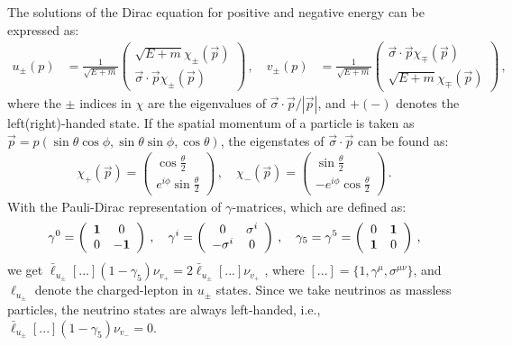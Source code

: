 \documentclass[prd,preprint,superscriptaddress,amsmath,amssymb]{revtex4}
\begin{document}
The solutions of the Dirac equation for positive and negative energy can be expressed as:
 \begin{align}
 u_{\pm} (p) &= \frac{1}{\sqrt{E+m} }
\left(
\begin{array}{c}
 \sqrt{E+m} \chi_{\pm} ( \vec{p})    \\
    \vec{\sigma}\cdot \vec{p} \chi_{\pm}(\vec{p})  
\end{array}
\right)\,, \quad  %
%
v_{\pm} (p) &= \frac{1}{\sqrt{E+m} }
\left(
\begin{array}{c}
  \vec{\sigma}\cdot \vec{p} \chi_{\mp}(\vec{p})    \\
     \sqrt{E+m} \chi_{\mp} ( \vec{p}) 
\end{array}
\right)\,, \label{eq:u_v}
 \end{align}
 where the $\pm$ indices in $\chi$ are the eigenvalues of $\vec{\sigma}\cdot \vec{p} /|\vec{p}|$, and  $+(-)$ denotes the left(right)-handed state. If the spatial momentum of a particle is taken as $\vec{p}= p(\sin\theta \cos\phi, \sin\theta\sin\phi, \cos\theta)$, the eigenstates of $\vec{\sigma} \cdot \vec{p}$ can be found as:
 \begin{align}
 \chi_+ (\vec{p}) = \left(
\begin{array}{c}
\cos\frac{\theta}{2}    \\
   e^{i\phi}
 \sin\frac{\theta}{2}\end{array}
\right)\,, \quad   \chi_{-}(\vec{p})= \left(
\begin{array}{c}
\sin\frac{\theta}{2}    \\
  - e^{i\phi} \cos\frac{\theta}{2}\end{array}
\right)\,. \label{eq:chi_pn}
 \end{align}
 With the Pauli-Dirac representation of  $\gamma$-matrices, which are defined as:
 \begin{align}
 \gamma^0 = \left(
\begin{array}{cc}
{\bf 1} & 0    \\
   0 &  -{\bf 1} \end{array}
\right)\,, 
%
\quad \gamma^i =  \left(
\begin{array}{cc}
0 &  \sigma^i   \\
   -\sigma^i & 0\end{array}
\right)\,,  \quad
%
 \gamma_5=\gamma^5 = \left(
\begin{array}{cc}
0 & {\bf 1}    \\
   {\bf 1} &  0 \end{array}
\right)\,,
 \end{align}
   we get $\bar \ell_{u_\pm} [...] (1-\gamma_5) \nu_{v_+} = 2 \bar \ell_{u_\pm} [...] \nu_{v_{+}}$ , where $[...] =\{ 1, \gamma^\mu, \sigma^{\mu \nu} \}$, and $\ell_{u_\pm}$ denote the charged-lepton in $u_{\pm}$ states. Since we take neutrinos as massless particles,  the neutrino states are always left-handed, i.e., $\bar \ell_{u_\pm} [...] (1-\gamma_5) \nu_{v_{-}}=0$.  
\end{document}
